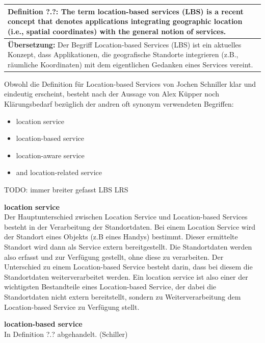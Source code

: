 \begin{table}[h]
	\centering
	\begin{tabular}{|p{16cm}|}\hline
		\textbf{Definition ?.?:} \glqq The term location-based services (LBS) is a recent concept that denotes applications integrating geographic location (i.e., spatial coordinates) with the general notion of services. \grqq \cite[S.1]{Schiller2004}\\ \hline
		\textbf{Übersetzung:} Der Begriff Location-based Services (LBS) ist ein aktuelles Konzept, dass Applikationen, die geografische Standorte integrieren (z.B., räumliche Koordinaten) mit dem eigentlichen Gedanken eines Services vereint. \\ \hline
	\end{tabular}
\end{table}

Obwohl die Definition für Location-based Services von Jochen Schniller klar und eindeutig erscheint, besteht nach der Aussage von Alex Küpper noch Klärungsbedarf bezüglich der andren oft synonym verwendeten Begriffen:
\begin{itemize}
\item location service
\item location-based service
\item location-aware service
\item and location-related service
\end{itemize}

TODO: immer breiter gefasst LBS LRS 

\textbf{location service} \\
Der Hauptunterschied zwischen Location Service und Location-based Services besteht in der Verarbeitung der Standortdaten. Bei einem Location Service wird der Standort eines Objekts (z.B eines Handys) bestimmt. Dieser ermittelte Standort wird dann als Service extern bereitgestellt. Die Standortdaten werden also erfasst und zur Verfügung gestellt, ohne diese zu verarbeiten.
Der Unterschied zu einem Location-based Service besteht darin, dass bei diesem die Standortdaten weiterverarbeitet werden. Ein location service ist also einer der wichtigsten Bestandteile eines Location-based Service, der dabei die Standortdaten nicht extern bereitstellt, sondern zu Weiterverarbeitung dem Location-based Service zu Verfügung stellt.

\textbf{location-based service} \\
In Definition ?.? abgehandelt. (Schiller)



